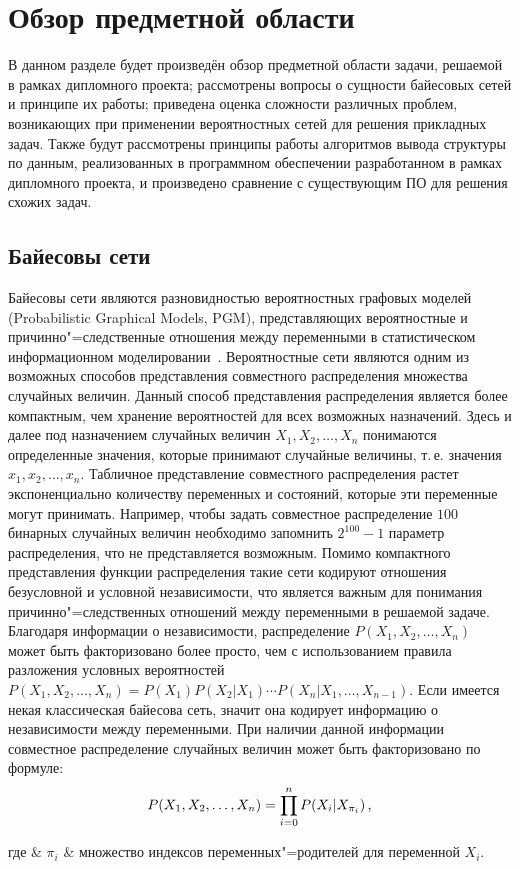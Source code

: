 \usepackage[T1]{fontenc}

\usepackage[utf8]{inputenc}

\section{Обзор предметной области}
\label{sec:domain}

В данном разделе будет произведён обзор предметной области задачи, решаемой в рамках дипломного проекта; рассмотрены вопросы о сущности байесовых сетей и принципе их работы; приведена оценка сложности различных проблем, возникающих при применении вероятностных сетей для решения прикладных задач.
Также будут рассмотрены принципы работы алгоритмов вывода структуры по данным, реализованных в программном обеспечении разработанном в рамках дипломного проекта, и произведено сравнение с существующим ПО для решения схожих задач.

\subsection{Байесовы сети}
\label{sub:domain:bayes_net}
Байесовы сети являются разновидностью вероятностных графовых моделей (Probabilistic Graphical Models, PGM), представляющих вероятностные и причинно"=следственные отношения между переменными в статистическом информационном моделировании~\cite{terehov_2003}.
Вероятностные сети являются одним из возможных способов представления совместного распределения множества случайных величин.
Данный способ представления распределения является более компактным, чем хранение вероятностей для всех возможных назначений.
Здесь и далее под назначением случайных величин $ X_1, X_2, \dotsc, X_n $ понимаются определенные значения, которые принимают случайные величины, т.\,е. значения $ x_1, x_2, \dotsc, x_n $.
Табличное представление совместного распределения растет экспоненциально количеству переменных и состояний, которые эти переменные могут принимать. 
Например, чтобы задать совместное распределение $ 100 $ бинарных случайных величин необходимо запомнить $ 2^{100} - 1 $ параметр распределения, что не представляется возможным.
Помимо компактного представления функции распределения такие сети кодируют отношения безусловной и условной независимости, что является важным для понимания причинно"=следственных отношений между переменными в решаемой задаче.
Благодаря информации о независимости, распределение $ P(X_1, X_2,\dotsc, X_n) $ может быть факторизовано более просто, чем с использованием правила разложения условных вероятностей $ P(X_1, X_2,\dotsc, X_n) = P(X_1) P(X_2|X_1) \dotsm P(X_n|X_1,\dotsc,X_{n-1}) $.
Если имеется некая классическая байесова сеть, значит она кодирует информацию о независимости между переменными.
При наличии данной информации совместное распределение случайных величин может быть факторизовано по формуле:
\begin{equation}
  \label{eq:domain:bayes_net:joint_disitr}
  P(X_1, X_2,\dotsc, X_n) = \prod_{i = 0}^{n}{P(X_i|X_{\pi_i})} \text{\,,}
\end{equation}
\begin{explanation}
где & $ \pi_i $ & множество индексов переменных"=родителей для переменной $X_i$.
\end{explanation}

